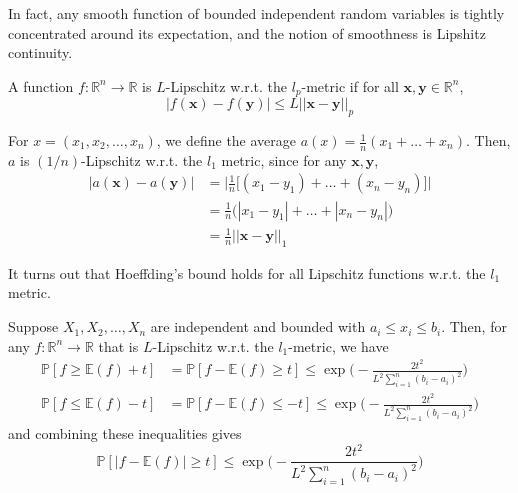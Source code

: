     In fact, any smooth function of bounded independent random variables is tightly concentrated around its expectation, and the notion of smoothness is Lipshitz continuity. 

    \begin{definition}
      A function $f: \mathbb{R}^n \longrightarrow \mathbb{R}$ is $L$-Lipschitz w.r.t. the $l_p$-metric if for all $\mathbf{x}, \mathbf{y} \in \mathbb{R}^n$, 
      \begin{equation}
        |f(\mathbf{x}) - f(\mathbf{y})| \leq L ||\mathbf{x} - \mathbf{y}||_p
      \end{equation}
    \end{definition}

    \begin{example}
      For $x = (x_1, x_2, \ldots, x_n)$, we define the average $a(x) = \frac{1}{n} (x_1 + \ldots + x_n)$. Then, $a$ is $(1/n)$-Lipschitz w.r.t. the $l_1$ metric, since for any $\mathbf{x}, \mathbf{y}$, 
      \begin{align*}
        |a(\mathbf{x}) - a(\mathbf{y})| & = \bigg| \frac{1}{n} \big[ (x_1 - y_1) + \ldots + (x_n - y_n) \big] \bigg| \\
        & = \frac{1}{n} \big( |x_1 - y_1| + \ldots + |x_n - y_n| \big) \\
        & = \frac{1}{n} ||\mathbf{x} - \mathbf{y} ||_1
      \end{align*}
    \end{example}

    It turns out that Hoeffding's bound holds for all Lipschitz functions w.r.t. the $l_1$ metric. 

    \begin{theorem}
      Suppose $X_1, X_2, \ldots, X_n$ are independent and bounded with $a_i \leq x_i \leq b_i$. Then, for any $f: \mathbb{R}^n \longrightarrow \mathbb{R}$ that is $L$-Lipschitz w.r.t. the $l_1$-metric, we have 
      \begin{align*}
        \mathbb{P} [ f \geq \mathbb{E}(f) + t] & = \mathbb{P} [ f - \mathbb{E}(f) \geq t] \leq \exp\bigg(- \frac{2 t^2}{L^2 \sum_{i=1}^n (b_i - a_i)^2} \bigg) \\
        \mathbb{P} [ f \leq \mathbb{E}(f) - t] & = \mathbb{P} [ f - \mathbb{E}(f) \leq -t] \leq \exp\bigg(- \frac{2 t^2}{L^2 \sum_{i=1}^n (b_i - a_i)^2} \bigg)
      \end{align*}
      and combining these inequalities gives 
      \begin{equation}
        \mathbb{P} [ |f - \mathbb{E}(f)| \geq t] \leq \exp\bigg(- \frac{2 t^2}{L^2 \sum_{i=1}^n (b_i - a_i)^2} \bigg)
      \end{equation}
    \end{theorem}

